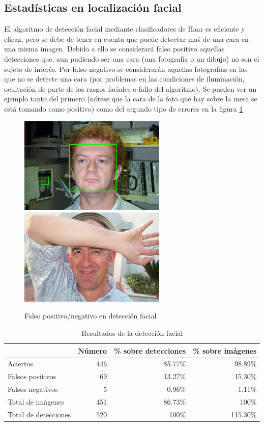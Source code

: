 \subsection{Estadísticas en localización facial}
El algoritmo de detección facial mediante clasificadores de Haar es eficiente y eficaz, pero se debe de tener en cuenta que puede detectar maś de una cara en una misma imagen. Debido a ello se considerará falso positivo aquellas detecciones que, aun pudiendo ser una cara (una fotografía o un dibujo) no son el sujeto de interés. Por falso negativo se considerarán aquellas fotografías en las que no se detecte una cara (por problemas en las condiciones de iluminación, ocultación de parte de los rasgos faciales o fallo del algoritmo). Se pueden ver un ejemplo tanto del primero (nótese que la cara de la foto que hay sobre la mesa se está tomando como positivo) como del segundo tipo de errores en la figura \ref{fig:facial_detection_problems}

\begin{figure}[!htb]
	\centering
	\includegraphics[width=7cm]{imagenes/falso_positivo.jpg}
	\includegraphics[width=7cm]{imagenes/falso_negativo.jpg}
	\caption{Falso positivo/negativo en detección facial}
	\label{fig:facial_detection_problems}
\end{figure}

\begin{table}
	\centering
	\begin{tabular}{|l||r|r|r|}
		\hline
		& Número & \% sobre detecciones & \% sobre imágenes \\
		\hline \hline
		Aciertos & 446 & 85.77\% & 98.89\%\\
		Falsos positivos & 69 & 13.27\% & 15.30\% \\
		Falsos negativos & 5 & 0.96\% & 1.11\% \\
		\hline
		Total de imágenes & 451 & 86.73\% & 100\% \\
		\hline
		Total de detecciones & 520 & 100\% & 115.30\%\\
		\hline
	\end{tabular}
	\caption{Resultados de la detección facial}
	\label{tab:face_detection_stats}
\end{table}

